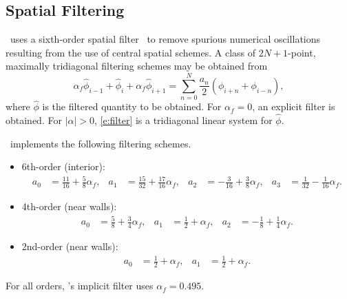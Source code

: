 \documentclass[letterpaper,10pt]{article}
\begin{document}
\subsection{Spatial Filtering} \label{s:filtering}

\code\ uses a sixth-order spatial filter~\cite{Lele1992} to remove spurious numerical oscillations resulting from the use of central spatial schemes. A class of $2N+1$-point, maximally tridiagonal filtering schemes may be obtained from
\begin{equation}
  \alpha_f \hat\phi_{i-1} + \hat\phi_i + \alpha_f\hat\phi_{i+1} = \sum_{n=0}^N \frac{a_n}{2}\left(\phi_{i+n} + \phi_{i-n}\right),
  \label{e:filter}
\end{equation}
where $\hat\phi$ is the filtered quantity to be obtained. For $\alpha_f=0$, an explicit filter is obtained. For $|\alpha| > 0$, \eqref{e:filter} is a tridiagonal linear system for $\hat \phi$.

\code\ implements the following filtering schemes.
\begin{itemize}
\item 6th-order (interior):
  \begin{align*}
    a_0 &= \frac{11}{16} + \frac{5}{8}\alpha_f, &
    a_1 &= \frac{15}{32} + \frac{17}{16}\alpha_f, &
    a_2 &= -\frac{3}{16} + \frac{3}{8}\alpha_f, &
    a_3 &= \frac{1}{32} - \frac{1}{16}\alpha_f.
  \end{align*}

\item 4th-order (near walls):
  \begin{align*}
    a_0 &= \frac{5}{8} + \frac{3}{4}\alpha_f, &
    a_1 &= \frac{1}{2} + \alpha_f, &
    a_2 &= -\frac{1}{8} + \frac{1}{4}\alpha_f.
  \end{align*}

\item 2nd-order (near walls):
  \begin{align*}
    a_0 &= \frac{1}{2} + \alpha_f, &
    a_1 &= \frac{1}{2} + \alpha_f.
  \end{align*}
  
\end{itemize}
For all orders, \code's  implicit filter uses $\alpha_f=0.495$.
\end{document}
